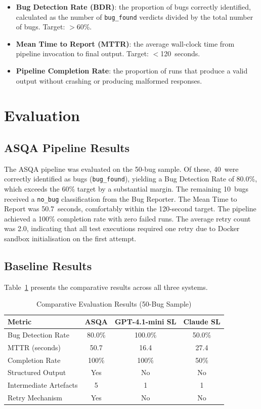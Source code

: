 \documentclass[conference]{IEEEtran}
\begin{document}
\begin{itemize}
    \item \textbf{Bug Detection Rate (BDR)}: the proportion of bugs correctly identified, calculated as the number of \texttt{bug\_found} verdicts divided by the total number of bugs. Target: $>$60\%.
    \item \textbf{Mean Time to Report (MTTR)}: the average wall-clock time from pipeline invocation to final output. Target: $<$120~seconds.
    \item \textbf{Pipeline Completion Rate}: the proportion of runs that produce a valid output without crashing or producing malformed responses.
\end{itemize}

\section{Evaluation}

\subsection{ASQA Pipeline Results}

The ASQA pipeline was evaluated on the 50-bug sample. Of these, 40~were correctly identified as bugs (\texttt{bug\_found}), yielding a Bug Detection Rate of 80.0\%, which exceeds the 60\% target by a substantial margin. The remaining 10~bugs received a \texttt{no\_bug} classification from the Bug Reporter. The Mean Time to Report was 50.7~seconds, comfortably within the 120-second target. The pipeline achieved a 100\% completion rate with zero failed runs. The average retry count was 2.0, indicating that all test executions required one retry due to Docker sandbox initialisation on the first attempt.

\subsection{Baseline Results}

Table~\ref{tab:comparison} presents the comparative results across all three systems.

\begin{table}[htbp]
\caption{Comparative Evaluation Results (50-Bug Sample)}
\label{tab:comparison}
\centering
\begin{tabular}{lccc}
\toprule
\textbf{Metric} & \textbf{ASQA} & \textbf{GPT-4.1-mini SL} & \textbf{Claude SL} \\
\midrule
Bug Detection Rate & 80.0\% & 100.0\% & 50.0\% \\
MTTR (seconds) & 50.7 & 16.4 & 27.4 \\
Completion Rate & 100\% & 100\% & 50\% \\
Structured Output & Yes & No & No \\
Intermediate Artefacts & 5 & 1 & 1 \\
Retry Mechanism & Yes & No & No \\
\bottomrule
\end{tabular}
\end{table}
\end{document}
